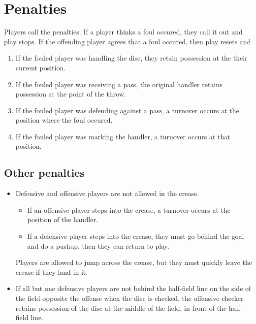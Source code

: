 \documentclass[10pt]{article}
\begin{document}
    \section{Penalties}

    Players call the penalties. If a player thinks a foul occured, they call it out and play stops. If the offending player agrees that a foul occured, then play resets and 
    \begin{enumerate}
        \item If the fouled player was handling the disc, they retain possession at the their current position.
        \item If the fouled player was receiving a pass, the original handler retains possession at the point of the throw.
        \item If the fouled player was defending against a pass, a turnover occurs at the position where the foul occured.
        \item If the fouled player was marking the handler, a turnover occurs at that position.
    \end{enumerate}

    \subsection{Other penalties}
    \begin{itemize}
        \item Defensive and offensive players are not allowed in the crease. 
        \begin{itemize}
            \item If an offensive player steps into the crease, a turnover occurs at the position of the handler.
            \item If a defensive player steps into the crease, they must go behind the goal and do a pushup, then they can return to play.
        \end{itemize}
        Players are allowed to jump across the crease, but they must quickly leave the crease if they land in it.
        \item If all but one defensive players are not behind the half-field line on the side of the field opposite the offense when the disc is checked, the offensive checker retains possession of the disc at the middle of the field, in front of the half-field line.
    \end{itemize}
\end{document}
